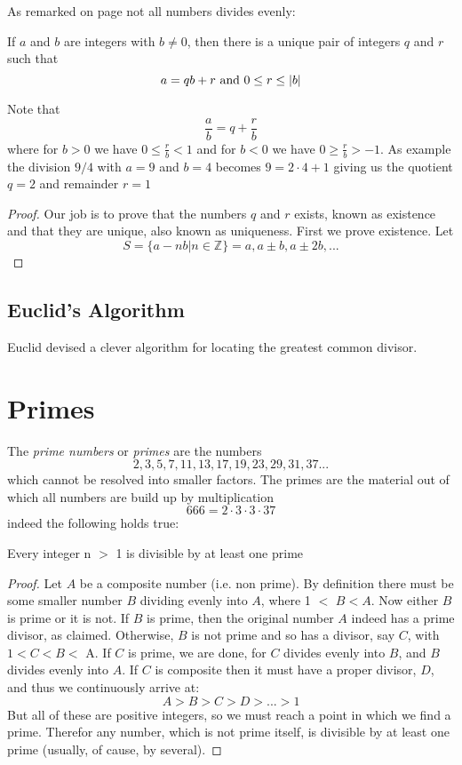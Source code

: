 As remarked on page \pageref{remainder} not all numbers divides evenly:
\begin{proposition}\label{division_algorithm}
If $a$ and $b$ are integers with $b\neq0$, then there is a unique pair of integers $q$ and $r$ such that
\[
a = qb+r \textnormal{ and } 0 \leq r \leq |b|
\]
\end{proposition}
Note that
\[
\frac{a}{b} = q + \frac{r}{b}
\]
where for $b>0$ we have $0 \leq \frac{r}{b} < 1$ and for $b<0$ we have $0 \geq \frac{r}{b} > -1$. As example the division $9/4$ with $a=9$ and $b=4$ becomes $9=2\cdot4 + 1$ giving us the quotient $q=2$ and remainder $r=1$
\begin{proof}
Our job is to prove that the numbers $q$ and $r$ exists, known as existence and that they are unique, also known as uniqueness. First we prove existence. Let
\[
S = \{a-nb|n \in \mathbb{Z}\} = {a,a \pm b,a \pm 2b,...}
\]
\end{proof}

\subsection{Euclid's Algorithm}
Euclid devised a clever algorithm for locating the greatest common divisor.

\section{Primes}
The \textit{prime numbers} or \textit{primes} are the numbers
\[
2, 3, 5, 7, 11, 13, 17, 19, 23, 29, 31, 37 ...
\]
which cannot be resolved into smaller factors. The primes are the material out of which all numbers are build up by multiplication
\[
666 = 2 \cdot 3 \cdot 3 \cdot 37
\]
indeed the following holds true:

\begin{proposition}\label{prim_div}
Every integer n $>$ 1 is divisible by at least one prime
\end{proposition}
\begin{proof}
Let $A$ be a composite number (i.e. non prime). By definition there must be some smaller number $B$ dividing evenly into $A$, where 1 $<$ $B < A$. Now either $B$ is prime or it is not. If $B$ is prime, then the original number $A$ indeed has a prime divisor, as claimed. Otherwise, $B$ is not prime and so has a divisor, say $C$, with $1 < C < B <$ A. If $C$ is prime, we are done, for $C$ divides evenly into $B$, and $B$ divides evenly into $A$. If $C$ is composite then it must have a proper divisor, $D$, and thus we continuously arrive at:
\[
A > B > C > D > ... > 1
\]
But all of these are positive integers, so we must reach a point in which we find a prime. Therefor any number, which is not prime itself, is divisible by at least one prime (usually, of cause, by several).
\end{proof}

